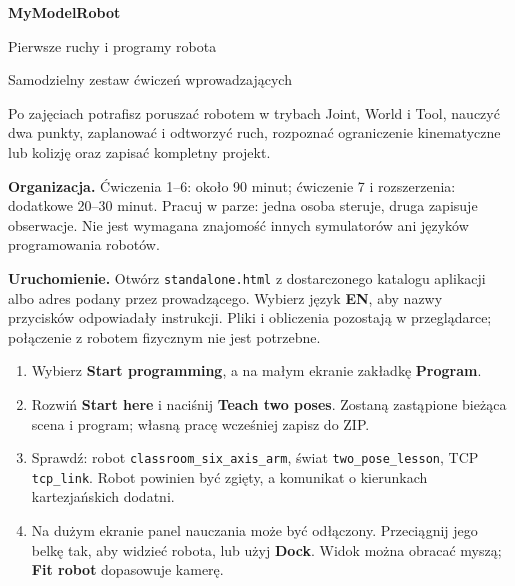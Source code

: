 \documentclass[10pt,a4paper]{article}
\newcommand{\ui}[1]{\textbf{\textsf{#1}}}
\newcommand{\cmd}[1]{\texttt{#1}}
\begin{document}
{\Huge\bfseries\color{navy} MyModelRobot}\par
{\LARGE Pierwsze ruchy i programy robota}\par
\textcolor{accent}{Samodzielny zestaw ćwiczeń wprowadzających}\par
\begin{goal}
Po zajęciach potrafisz poruszać robotem w trybach Joint, World i Tool, nauczyć dwa punkty, zaplanować i odtworzyć ruch, rozpoznać ograniczenie kinematyczne lub kolizję oraz zapisać kompletny projekt.
\end{goal}
\textbf{Organizacja.} Ćwiczenia 1--6: około 90 minut; ćwiczenie 7 i rozszerzenia: dodatkowe 20--30 minut. Pracuj w parze: jedna osoba steruje, druga zapisuje obserwacje. Nie jest wymagana znajomość innych symulatorów ani języków programowania robotów.

\textbf{Uruchomienie.} Otwórz \cmd{standalone.html} z dostarczonego katalogu aplikacji albo adres podany przez prowadzącego. Wybierz język \ui{EN}, aby nazwy przycisków odpowiadały instrukcji. Pliki i obliczenia pozostają w przeglądarce; połączenie z robotem fizycznym nie jest potrzebne.

\begin{enumerate}
\item Wybierz \ui{Start programming}, a na małym ekranie zakładkę \ui{Program}.
\item Rozwiń \ui{Start here} i naciśnij \ui{Teach two poses}. Zostaną zastąpione bieżąca scena i program; własną pracę wcześniej zapisz do ZIP.
\item Sprawdź: robot \cmd{classroom\_six\_axis\_arm}, świat \cmd{two\_pose\_lesson}, TCP \cmd{tcp\_link}. Robot powinien być zgięty, a komunikat o kierunkach kartezjańskich dodatni.
\item Na dużym ekranie panel nauczania może być odłączony. Przeciągnij jego belkę tak, aby widzieć robota, lub użyj \ui{Dock}. Widok można obracać myszą; \ui{Fit robot} dopasowuje kamerę.
\end{enumerate}

\begin{center}
\end{center}
\end{document}
